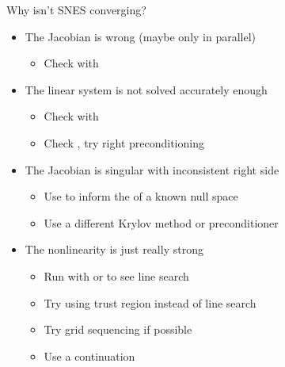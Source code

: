 \begin{frame}{Why isn't SNES converging?}

\begin{itemize}
  \item The Jacobian is wrong (maybe only in parallel)
  \begin{itemize}
    \item Check with 
  \end{itemize}
  \item The linear system is not solved accurately enough
  \begin{itemize}
    \item Check with 
    \item Check , try right preconditioning
  \end{itemize}
  \item The Jacobian is singular with inconsistent right side
  \begin{itemize}
    \item Use  to inform the  of a known null space
    \item Use a different Krylov method or preconditioner
  \end{itemize}
  \item The nonlinearity is just really strong
  \begin{itemize}
    \item Run with  or  to see line search
    \item Try using trust region instead of line search 
    \item Try grid sequencing if possible 
    \item Use a continuation
  \end{itemize}
\end{itemize}
\end{frame}
